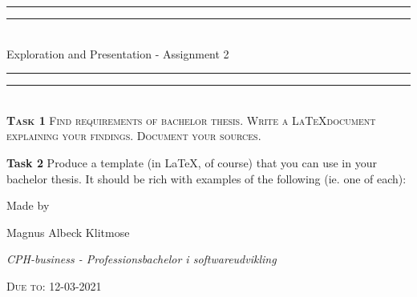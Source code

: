   \begin{titlepage}
    \centering
    \vspace*{\baselineskip}
    \rule{\textwidth}{1.6pt}\vspace*{-\baselineskip}\vspace*{2pt}
    \rule{\textwidth}{0.4pt}\\[\baselineskip]
    {\LARGE Exploration and Presentation - Assignment 2}\\[0.2\baselineskip]
    \rule{\textwidth}{0.4pt}\vspace*{-\baselineskip}\vspace{3.2pt}
    \rule{\textwidth}{1.6pt}\\[\baselineskip]
    \scshape
   \textbf{Task 1}
    Find requirements of bachelor thesis. Write a \LaTeX document explaining your
    findings. Document your sources.\\
   \vspace{0.5cm}
      
    \textbf{Task 2}
    Produce a template (in \LaTeX, of course) that you can use in your bachelor
    thesis. It should be rich with examples of the following (ie. one of each):
    \par
    \vspace*{2\baselineskip}
    Made by \\[\baselineskip]
    {\Large Magnus Albeck Klitmose\par}
    {\itshape CPH-business - Professionsbachelor i softwareudvikling\par}
    \vfill
    {\scshape Due to: 12-03-2021} \\
  
  \end{titlepage}
  
  